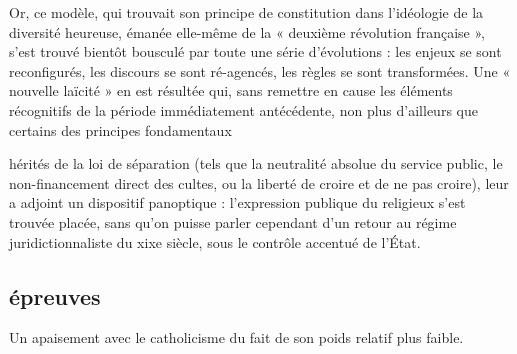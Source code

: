 Or, ce modèle, qui trouvait son principe de constitution dans l’idéologie de la diversité heureuse, émanée elle-même de la « deuxième révolution française », s’est trouvé bientôt bousculé par toute une série d’évolutions : les enjeux se sont reconfigurés, les discours se sont ré-agencés, les règles se sont transformées. Une « nouvelle laïcité » en est résultée qui, sans remettre en cause les éléments récognitifs de la période immédiatement antécédente, non plus d’ailleurs que certains des principes fondamentaux

\mn{}
hérités de la loi de séparation (tels que la neutralité absolue du service public, le non-financement direct des cultes, ou la liberté de croire et de ne pas croire), leur a adjoint un dispositif panoptique : l’expression publique du religieux s’est trouvée placée, sans qu’on puisse parler cependant d’un retour au régime juridictionnaliste du xixe siècle, sous le contrôle accentué de l’État.

\subsection{épreuves}
\begin{Synthesis}
Un apaisement avec le catholicisme du fait de son poids relatif plus faible.
\end{Synthesis}


